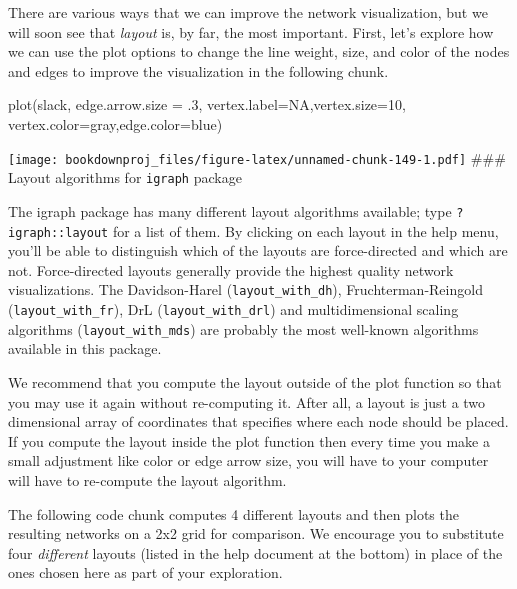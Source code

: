 \documentclass[
]{article}
\newenvironment{Shaded}{\begin{snugshade}}{\end{snugshade}}
\newcommand{\AttributeTok}[1]{\textcolor[rgb]{0.77,0.63,0.00}{#1}}
\newcommand{\ConstantTok}[1]{\textcolor[rgb]{0.00,0.00,0.00}{#1}}
\newcommand{\DecValTok}[1]{\textcolor[rgb]{0.00,0.00,0.81}{#1}}
\newcommand{\FunctionTok}[1]{\textcolor[rgb]{0.00,0.00,0.00}{#1}}
\newcommand{\NormalTok}[1]{#1}
\newcommand{\StringTok}[1]{\textcolor[rgb]{0.31,0.60,0.02}{#1}}
\theoremstyle{definition}
\theoremstyle{definition}
\theoremstyle{definition}
\theoremstyle{definition}
\theoremstyle{remark}
\begin{document}
There are various ways that we can improve the network visualization, but we will soon see that \emph{layout} is, by far, the most important. First, let's explore how we can use the plot options to change the line weight, size, and color of the nodes and edges to improve the visualization in the following chunk.

\begin{Shaded}
\begin{Highlighting}[]
\FunctionTok{plot}\NormalTok{(slack, }\AttributeTok{edge.arrow.size =}\NormalTok{ .}\DecValTok{3}\NormalTok{, }\AttributeTok{vertex.label=}\ConstantTok{NA}\NormalTok{,}\AttributeTok{vertex.size=}\DecValTok{10}\NormalTok{,}
     \AttributeTok{vertex.color=}\StringTok{\textquotesingle{}gray\textquotesingle{}}\NormalTok{,}\AttributeTok{edge.color=}\StringTok{\textquotesingle{}blue\textquotesingle{}}\NormalTok{)}
\end{Highlighting}
\end{Shaded}

\texttt{[image: bookdownproj\_files/figure-latex/unnamed-chunk-149-1.pdf]}
\#\#\# Layout algorithms for \texttt{igraph} package

The igraph package has many different layout algorithms available; type \texttt{?igraph::layout} for a list of them. By clicking on each layout in the help menu, you'll be able to distinguish which of the layouts are force-directed and which are not. Force-directed layouts generally provide the highest quality network visualizations. The Davidson-Harel (\texttt{layout\_with\_dh}), Fruchterman-Reingold (\texttt{layout\_with\_fr}), DrL (\texttt{layout\_with\_drl}) and multidimensional scaling algorithms (\texttt{layout\_with\_mds}) are probably the most well-known algorithms available in this package.

We recommend that you compute the layout outside of the plot function so that you may use it again without re-computing it. After all, a layout is just a two dimensional array of coordinates that specifies where each node should be placed. If you compute the layout inside the plot function then every time you make a small adjustment like color or edge arrow size, you will have to your computer will have to re-compute the layout algorithm.

The following code chunk computes 4 different layouts and then plots the resulting networks on a 2x2 grid for comparison. We encourage you to substitute four \emph{different} layouts (listed in the help document at the bottom) in place of the ones chosen here as part of your exploration.
\end{document}
